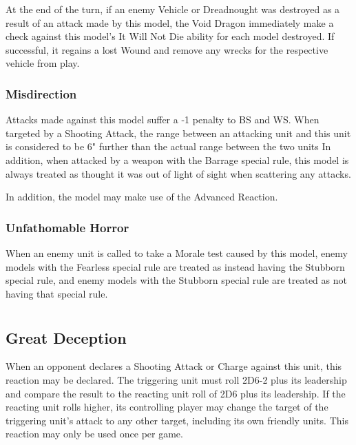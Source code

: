 At the end of the turn, if an enemy Vehicle or Dreadnought was destroyed as a result of an attack made by this model, the Void Dragon immediately make a check against this model's It Will Not Die ability for each model destroyed. If successful, it regains a lost Wound and remove any wrecks for the respective vehicle from play.

\subsubsection{Misdirection} \label{Misdirection}

Attacks made against this model suffer a -1 penalty to BS and WS. When targeted by a Shooting Attack, the range between an attacking unit and this unit is considered to be 6" further than the actual range between the two units In addition, when attacked by a weapon with the Barrage special rule, this model is always treated as thought it was out of light of sight when scattering any attacks.

In addition, the model may make use of the  Advanced Reaction.

\subsubsection{Unfathomable Horror} \label{Unfathomable Horror}

When an enemy unit is called to take a Morale test caused by this model, enemy models with the Fearless special rule are treated as instead having the Stubborn special rule, and enemy models with the Stubborn special rule are treated as not having that special rule.

\section[Reactions]{}

\subsection{Great Deception} \label{Great Deception}

When an opponent declares a Shooting Attack or Charge against this unit, this reaction may be declared. The triggering unit must roll 2D6-2 plus its leadership and compare the result to the reacting unit roll of 2D6 plus its leadership. If the reacting unit rolls higher, its controlling player may change the target of the triggering unit's attack to any other target, including its own friendly units. This reaction may only be used once per game.

